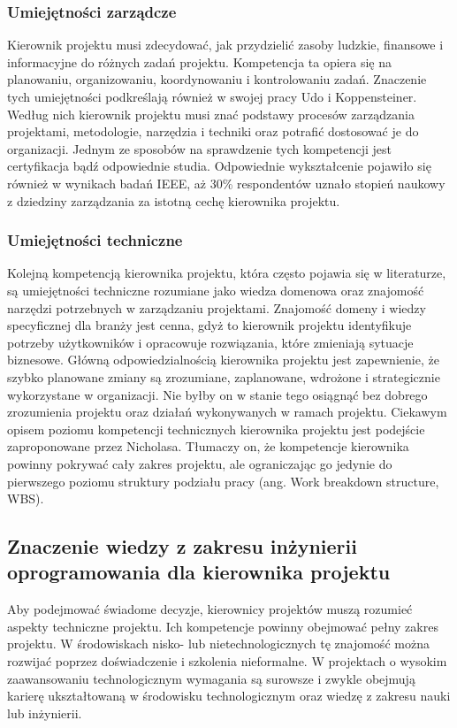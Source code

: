 \subsubsection{Umiejętności zarządcze}
Kierownik projektu musi zdecydować, jak przydzielić zasoby ludzkie, finansowe i informacyjne do różnych zadań projektu. Kompetencja ta opiera się na planowaniu, organizowaniu, koordynowaniu i kontrolowaniu zadań.\autocite{Gottschalk} Znaczenie tych umiejętności podkreślają również w swojej pracy Udo i Koppensteiner. Według nich kierownik projektu musi znać podstawy procesów zarządzania projektami, metodologie, narzędzia i techniki oraz potrafić dostosować je do organizacji.
Jednym ze sposobów na sprawdzenie tych kompetencji jest certyfikacja bądź odpowiednie studia.\autocite{Koppensteiner} Odpowiednie wykształcenie pojawiło się również w wynikach badań IEEE, aż 30\% respondentów uznało stopień naukowy z dziedziny zarządzania za istotną cechę kierownika projektu.\autocite{analizaMulti}

\subsubsection{Umiejętności techniczne}
Kolejną kompetencją kierownika projektu, która często pojawia się w literaturze, są umiejętności techniczne rozumiane jako wiedza domenowa oraz znajomość narzędzi potrzebnych w zarządzaniu projektami. \autocite{arras2010} \autocite{brill}
Znajomość domeny i wiedzy specyficznej dla branży jest cenna, gdyż to kierownik projektu identyfikuje potrzeby użytkowników i opracowuje rozwiązania, które zmieniają sytuacje biznesowe. Główną odpowiedzialnością kierownika projektu jest zapewnienie, że szybko planowane zmiany są zrozumiane, zaplanowane, wdrożone i strategicznie wykorzystane w organizacji.\autocite{Gottschalk} Nie byłby on w stanie tego osiągnąć bez dobrego zrozumienia projektu oraz działań wykonywanych w ramach projektu.
Ciekawym opisem poziomu kompetencji technicznych kierownika projektu jest podejście zaproponowane przez Nicholasa. Tłumaczy on, że kompetencje kierownika powinny pokrywać cały zakres projektu, ale ograniczając go jedynie do pierwszego poziomu struktury podziału pracy (ang. Work breakdown structure, WBS).\autocite{NicholasSteyn}

\subsection{Znaczenie wiedzy z zakresu inżynierii oprogramowania dla kierownika projektu}
Aby podejmować świadome decyzje, kierownicy projektów muszą rozumieć aspekty techniczne projektu. Ich kompetencje powinny obejmować pełny zakres projektu. W środowiskach nisko- lub nietechnologicznych tę znajomość można rozwijać poprzez doświadczenie i szkolenia nieformalne. W projektach o wysokim zaawansowaniu technologicznym wymagania są surowsze i zwykle obejmują karierę ukształtowaną w środowisku technologicznym oraz wiedzę z zakresu nauki lub inżynierii.

